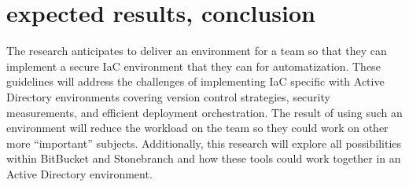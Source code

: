 \section{expected results, conclusion}%
\label{sec:expected_results}

The research anticipates to deliver an environment for a team so that they can implement a secure IaC environment that they can for automatization.  These guidelines will address the challenges of implementing IaC specific with Active Directory environments covering version control strategies, security measurements, and efficient deployment orchestration. The result of using such an environment will reduce the workload on the team so they could work on other more “important” subjects. Additionally, this research will explore all possibilities within BitBucket and Stonebranch and how these tools could work together in an Active Directory environment.

